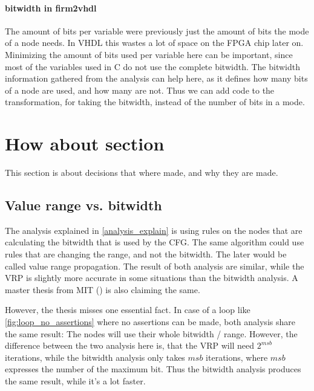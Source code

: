 \paragraph{bitwidth in firm2vhdl}
The amount of bits per variable were previously just the amount of bits the mode of a node needs. In VHDL this wastes a lot of space on the FPGA chip later on. Minimizing the amount of bits used per variable here can be important, since most of the variables used in C do not use the complete bitwidth.\newline
The bitwidth information gathered from the analysis can help here, as it defines how many bits of a node are used, and how many are not. Thus we can add code to the transformation, for taking the bitwidth, instead of the number of bits in a mode.


\section{How about section}
This section is about decisions that where made, and why they are made.

\subsection{Value range vs. bitwidth}

The analysis explained in \ref{analysis_explain} is using rules on the nodes that are calculating the bitwidth that is used by the CFG. The same algorithm could use rules that are changing the range, and not the bitwidth. The later would be called value range propagation. The result of both analysis are similar, while the VRP is slightly more accurate in some situations than the bitwidth analysis. A master thesis from MIT (\cite{bitwidthanalysis-mit-vrp}) is also claiming the same.



However, the thesis misses one essential fact. In case of a loop like \ref{fig:loop_no_assertions} where no assertions can be made, both analysis share the same result: The nodes will use their whole bitwidth / range. However, the difference between the two analysis here is, that the VRP will need $2^{msb}$ iterations, while the bitwidth analysis only takes $msb$ iterations, where $msb$ expresses the number of the maximum bit. Thus the bitwidth analysis produces the same result, while it's a lot faster.

